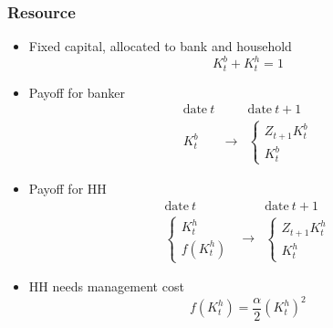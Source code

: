 \begin{frame}
    \frametitle{Resource}

    \begin{itemize}
        \item Fixed capital, allocated to bank and household
        \begin{equation}
            K^b_t + K^h_t = 1
        \end{equation}
        \item Payoff for banker 
        \begin{equation}
            \begin{array}{ccc}
                \text{date}~t & & \text{date}~ t+1 \\
                K^b_t & \rightarrow & \begin{cases}
                    Z_{t+1}K^b_t \\
                    K^b_t
                \end{cases}        
            \end{array}
        \end{equation}
    \item Payoff for HH
        \begin{equation}
            \begin{array}{ccc}
                \text{date}~t & & \text{date}~ t+1 \\
                \begin{cases}
                    K^h_t \\
                    f(K^h_t)
                \end{cases} 
                & \rightarrow & \begin{cases}
                    Z_{t+1}K^h_t \\
                    K^h_t
                \end{cases}        
            \end{array}
        \end{equation} 
    \item HH needs management cost 
    \begin{equation}
        f(K^h_t) = \frac{\alpha}{2} (K^h_t)^2
    \end{equation}
    \end{itemize}
\end{frame}